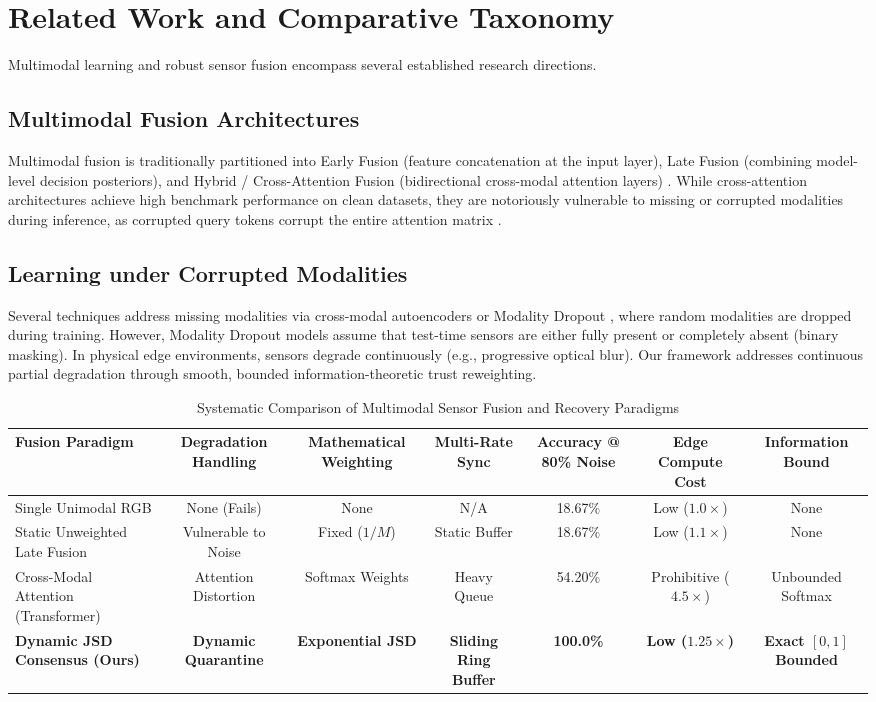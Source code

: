 \documentclass[10pt,journal,compsoc]{IEEEtran}
\begin{document}
\section{Related Work and Comparative Taxonomy}
Multimodal learning and robust sensor fusion encompass several established research directions.

\subsection{Multimodal Fusion Architectures}
Multimodal fusion is traditionally partitioned into Early Fusion (feature concatenation at the input layer), Late Fusion (combining model-level decision posteriors), and Hybrid / Cross-Attention Fusion (bidirectional cross-modal attention layers) \cite{baltrusaitis2018multimodal, nagrani2021attention}. While cross-attention architectures achieve high benchmark performance on clean datasets, they are notoriously vulnerable to missing or corrupted modalities during inference, as corrupted query tokens corrupt the entire attention matrix \cite{ma2021smil}.

\subsection{Learning under Corrupted Modalities}
Several techniques address missing modalities via cross-modal autoencoders or Modality Dropout \cite{neverova2015moddrop}, where random modalities are dropped during training. However, Modality Dropout models assume that test-time sensors are either fully present or completely absent (binary masking). In physical edge environments, sensors degrade continuously (e.g., progressive optical blur). Our framework addresses continuous partial degradation through smooth, bounded information-theoretic trust reweighting.

\begin{table}[t]
\caption{Systematic Comparison of Multimodal Sensor Fusion and Recovery Paradigms}
\label{tab:fusion_taxonomy}
\centering
\begin{tabular}{lcccccc}
\toprule
\textbf{Fusion Paradigm} & \textbf{Degradation Handling} & \textbf{Mathematical Weighting} & \textbf{Multi-Rate Sync} & \textbf{Accuracy @ 80\% Noise} & \textbf{Edge Compute Cost} & \textbf{Information Bound} \\
\midrule
Single Unimodal RGB & None (Fails) & None & N/A & 18.67\% & Low ($1.0\times$) & None \\
Static Unweighted Late Fusion & Vulnerable to Noise & Fixed ($1/M$) & Static Buffer & 18.67\% & Low ($1.1\times$) & None \\
Cross-Modal Attention (Transformer) & Attention Distortion & Softmax Weights & Heavy Queue & 54.20\% & Prohibitive ($4.5\times$) & Unbounded Softmax \\
\textbf{Dynamic JSD Consensus (Ours)} & \textbf{Dynamic Quarantine} & \textbf{Exponential JSD} & \textbf{Sliding Ring Buffer} & \textbf{100.0\%} & \textbf{Low ($1.25\times$)} & \textbf{Exact $[0, 1]$ Bounded} \\
\bottomrule
\end{tabular}
\end{table}
\end{document}
